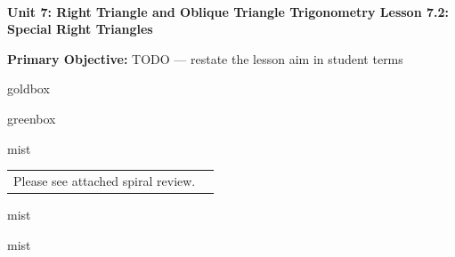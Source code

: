 \documentclass[10pt]{article}
\newcommand{\UnitNumberName}{Unit 7: Right Triangle and Oblique Triangle Trigonometry \quad}
\newcommand{\LessonNumberName}{Lesson 7.2: Special Right Triangles}
\begin{document}
\begin{center}
    {\Large\bfseries \CourseName \\
    {\small\bfseries \UnitNumberName \LessonNumberName}}
\end{center}

\begin{tcolorbox}[colback=mist, colframe=royal, boxrule=0.9pt, arc=2mm,
    left=2mm, right=2mm, top=1.5mm, bottom=1.5mm]
    \textbf{Primary Objective:} TODO --- restate the lesson aim in student terms
\end{tcolorbox}

\renewcommand{\arraystretch}{1.6}
\begin{skillbox}{goldbox}
\end{skillbox}

\begin{skillbox}{greenbox}
\end{skillbox}

\begin{fixedskillbox}{mist}
    \begin{tabularx}{\linewidth}{@{}X c@{}}
        \begin{minipage}[t]{0.55\linewidth}\vspace{0pt}
            Please see attached spiral review.  %
        \end{minipage}
        &
        \begin{minipage}[t]{0.38\linewidth}\vspace{0pt}\centering
        \end{minipage}
    \end{tabularx}
\end{fixedskillbox}

\begin{skillbox}[Hook]{mist}
\end{skillbox}

\begin{skillbox}[Lesson]{mist}
\end{skillbox}
\end{document}
